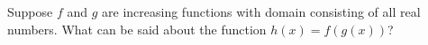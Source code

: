 \documentclass{ximera}
\begin{document}
\begin{problem}

  Suppose $f$ and $g$ are increasing functions with domain consisting of all real numbers.  What can be said about the function $h(x) = f(g(x))$?
  \begin{multipleChoice}
  \end{multipleChoice}
\end{problem}
\end{document}
